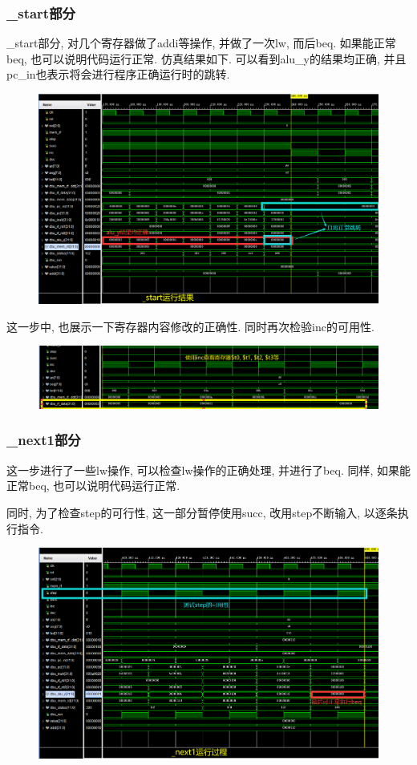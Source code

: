 \documentclass[UTF8]{article}
\begin{document}
\subsubsection{\_start部分}
\_start部分, 对几个寄存器做了addi等操作, 并做了一次lw, 而后beq. 如果能正常beq, 也可以说明代码运行正常.
仿真结果如下. 可以看到alu\_y的结果均正确, 并且pc\_in也表示将会进行程序正确运行时的跳转.
\begin{figure}[H]
	\centering
	\includegraphics[width=\linewidth]{_start.png}
\end{figure}
这一步中, 也展示一下寄存器内容修改的正确性. 同时再次检验inc的可用性.
\begin{figure}[H]
	\centering
	\includegraphics[width=\linewidth]{_start_data.png}
\end{figure}
\subsubsection{\_next1部分}
这一步进行了一些lw操作, 可以检查lw操作的正确处理, 并进行了beq. 同样, 如果能正常beq, 也可以说明代码运行正常.\par
同时, 为了检查step的可行性, 这一部分暂停使用succ, 改用step不断输入, 以逐条执行指令.
\begin{figure}[H]
	\centering
	\includegraphics[width=\linewidth]{_next1.png}
\end{figure}
\end{document}
